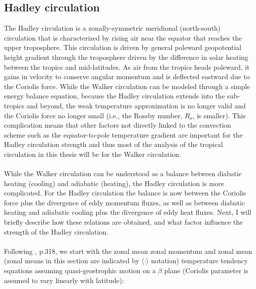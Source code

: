 \documentclass[letterpaper,12pt,titlepage,oneside,final]{book}
\begin{document}
\subsection{Hadley circulation}\label{HC}

The Hadley circulation is a zonally-symmetric meridional (north-south) circulation that is characterized by rising air near the equator that reaches the upper troposphere. This circulation is driven by general poleward geopotential height gradient through the troposphere driven by the difference in solar heating between the tropics and mid-latitudes. As air from the tropics heads poleward, it gains in velocity to conserve angular momentum and is deflected eastward due to the Coriolis force. While the Walker circulation can be modeled through a simple energy balance equation, because the Hadley circulation extends into the sub-tropics and beyond, the weak temperature approximation is no longer valid and the Coriolis force no longer small (i.e., the Rossby number, $R_{o}$, is smaller). This complication means that other factors not directly linked to the convection scheme such as the equator-to-pole temperature gradient are important for the Hadley circulation strength and thus most of the analysis of the tropical circulation in this thesis will be for the Walker circulation.
\\
\\
While the Walker circulation can be understood as a balance between diabatic heating (cooling) and adiabatic (heating), the Hadley circulation is more complicated. For the Hadley circulation the balance is now between the Coriolis force plus the divergence of eddy momentum fluxes, as well as between diabatic heating and adiabatic cooling plus the divergence of eddy heat fluxes. Next, I will briefly describe how these relations are obtained, and what factor influence the strength of the Hadley circulation. 
\\
\\
Following \citep{holton_introduction_2004}, p.318, we start with the zonal mean zonal momentum and zonal mean (zonal means in this section are indicated by $\langle \cdot \rangle$ notation) temperature tendency equations assuming quasi-geostrophic motion on a $\beta$ plane (Coriolis parameter is assumed to vary linearly with latitude):
\end{document}
